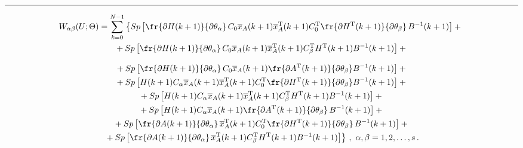 \hrule








\begin{multline*}


W_{\alpha\beta}(U;\Theta)=


\sum\limits_{k=0}^{N-1}\left \{


Sp\left [


\fr{\partial H(k+1)}{\partial


\theta_\alpha}\,C_0\overline{x}_A(k+1)\overline{x}_A^{\mathrm{T}}(k+1)C_0^{\mathrm{T}}\fr{\partial


H^{\mathrm{T}}(k+1)}{\partial \theta_\beta}\,B^{-1}(k+1)\right ]+{}\right.\\


{}+Sp\left[\fr{\partial H(k+1)}{\partial\theta_\alpha}\,C_0\overline{x}_A(k+1)


\overline{x}_A^{\mathrm{T}}(k+1)C_{\beta}^{\mathrm{T}} H^{\mathrm{T}}(k+1) B^{-1}(k+1)\right]+{}


\end{multline*}





\noindent


\begin{multline*}


{}+ Sp\left[\fr{\partial


H(k+1)}{\partial\theta_\alpha}\,C_0\overline{x}_A(k+1)\fr{\partial


A^{\mathrm{T}}(k+1)}{\partial\theta_\beta} B^{-1}(k+1)\right]+{}\\


{}+


Sp\left[H(k+1)C_\alpha\overline{x}_A(k+1)\overline{x}_A^{\mathrm{T}}(k+1)C_0^{\mathrm{T}}\fr{\partial


H^{\mathrm{T}}(k+1)}{\partial\theta_\beta} B^{-1}(k+1)\right]+{}\\


{}+Sp\left[ H(k+1)C_\alpha\overline{x}_A(k+1)\overline{x}_A^{\mathrm{T}}(k+1) C_\beta^{\mathrm{T}}


H^{\mathrm{T}}(k+1) B^{-1}(k+1)\right]+{}\\


{}+Sp\left[ H(k+1)C_\alpha \overline{x}_A(k+1)\fr{\partial


A^{\mathrm{T}}(k+1)}{\partial\theta_\beta}\,B^{-1}(k+1)\right]+{}\\


{}+Sp\left[ \fr{\partial


A(k+1)}{\partial\theta_\alpha}\,\overline{x}_A^{\mathrm{T}}(k+1)C_0^{\mathrm{T}}\fr{\partial


H^{\mathrm{T}}(k+1)}{\partial \theta_\beta}\,B^{-1}(k+1)\right]+{}\\


\left.{}+ Sp\left[ \fr{\partial


A(k+1)}{\partial\theta_\alpha}\,\overline{x}_A^{\mathrm{T}}(k+1)C_\beta^{\mathrm{T}} H^{\mathrm{T}} (k+1) B^{-1}(k+1)


\right]\right\}\,,\ \alpha,\beta=1, 2, \ldots , s\,.


\end{multline*}


